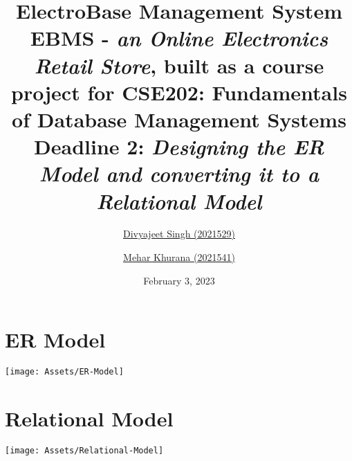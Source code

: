 \documentclass[12pt]{report}
\title{
    \textbf{\Huge ElectroBase Management System} \\
    \vspace*{15pt}
    \large{
        EBMS - \textit{an Online Electronics Retail Store}, built as a course project for
        \normalsize{CSE202: Fundamentals of Database Management Systems} \\
    }
    \vspace*{25pt}
    \textbf{Deadline 2:} \textit{Designing the ER Model and converting it to a Relational Model}
    \vspace*{5pt}
}
\author{
    \href{mailto:divyajeet21529@iiitd.ac.in}{Divyajeet Singh (2021529)}
    \and
    \href{mailto:mehar21541@iiitd.ac.in}{Mehar Khurana (2021541)}
}
\date{\vspace*{10pt} February 3, 2023}
\begin{document}
    \maketitle

    \section*{\Huge ER Model}
    \vspace*{50pt}
    \begin{center}
        \texttt{[image: Assets/ER-Model]}
    \end{center}

    \pagebreak

    \section*{\Huge Relational Model}
    \vspace*{30pt}
    \begin{center}
        \texttt{[image: Assets/Relational-Model]}
    \end{center}
\end{document}
